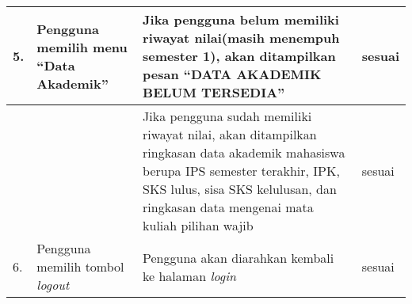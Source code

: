 \begin{table}[H]
\begin{tabular}{|p{0.5cm}| p{5cm}| p{6cm}| p{1.75cm}|}
				5.	&	Pengguna memilih menu ``Data Akademik'' &	Jika pengguna belum memiliki riwayat nilai(masih menempuh semester 1), akan ditampilkan pesan ``DATA AKADEMIK BELUM TERSEDIA'' &	sesuai	\\ \hline
					&	&	Jika pengguna sudah memiliki riwayat nilai, akan ditampilkan ringkasan data akademik mahasiswa berupa IPS semester terakhir, IPK, SKS lulus, sisa SKS kelulusan, dan ringkasan data mengenai mata kuliah pilihan wajib &	sesuai	\\ \hline
				6.	&	Pengguna memilih tombol \textit{logout}	&	Pengguna akan diarahkan kembali ke halaman \textit{login} &	sesuai	\\ \hline
				\end{tabular}
				\label{table:hasilFungsional}
			\end{table}